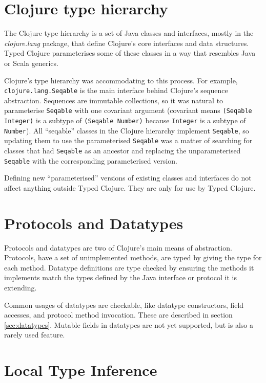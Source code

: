\section{Clojure type hierarchy}

The Clojure type hierarchy is a set of Java classes and interfaces, mostly in the
\emph{clojure.lang} package, that define Clojure's core 
interfaces and data structures.
Typed Clojure parameterises some of these classes in a way that resembles
Java or Scala generics.

Clojure's type hierarchy was accommodating to this process.
For example, \lstinline{clojure.lang.Seqable} is the main interface behind
Clojure's sequence abstraction. Sequences are immutable collections,
so it was natural to parameterise \lstinline{Seqable} with one covariant
argument (covariant means \lstinline|(Seqable Integer)| is
a subtype of \lstinline|(Seqable Number)| because \lstinline|Integer|
is a subtype of \lstinline|Number|).
All ``seqable'' classes in the Clojure hierarchy implement \lstinline|Seqable|,
so updating them to use the parameterised \lstinline|Seqable| was a matter of
searching for classes that had \lstinline|Seqable| as an ancestor and replacing
the unparameterised \lstinline|Seqable| with the corresponding parameterised 
version.

Defining new ``parameterised'' versions of existing classes and interfaces do 
not affect anything outside Typed Clojure.
They are only for use by Typed Clojure.

\section{Protocols and Datatypes}

Protocols and datatypes are two of Clojure's main means of abstraction.
Protocols, have a set of unimplemented methods, are typed by
giving the type for each method.
Datatype definitions are type checked by ensuring the methods it
implements match the types defined by the Java interface or protocol
it is extending.

Common usages of datatypes are checkable, like datatype
constructors, field accesses, and protocol method invocation.
These are described in section \ref{sec:datatypes}.
Mutable fields in datatypes are not yet supported, but is
also a rarely used feature.

\section{Local Type Inference}

